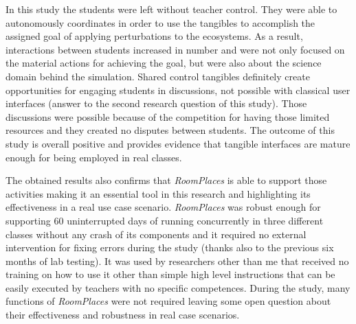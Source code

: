 In this study the students were left without teacher control. They were able to autonomously coordinates in order to use the tangibles to accomplish the assigned goal of applying perturbations to the ecosystems. As a result, interactions between students increased in number and were not only focused on the material actions for achieving the goal, but were also about the science domain behind the simulation. Shared control tangibles definitely create opportunities for engaging students in discussions, not possible with classical user interfaces (answer to the second research question of this study). Those discussions were possible because of the competition for having those limited resources and they created no disputes between students. The outcome of this study is overall positive and provides evidence that tangible interfaces are mature enough for being employed in real classes. 

The obtained results also confirms that \textit{RoomPlaces} is able to support those activities making it an essential tool in this research and highlighting its effectiveness in a real use case scenario. \textit{RoomPlaces} was robust enough for supporting 60 uninterrupted days of running concurrently in three different classes without any crash of its components and it required no external intervention for fixing errors during the study (thanks also to the previous six months of lab testing). It was used by researchers other than me that received no training on how to use it other than simple high level instructions that can be easily executed by teachers with no specific competences. During the study, many functions of \textit{RoomPlaces} were not required leaving some open question about their effectiveness and robustness in real case scenarios.
